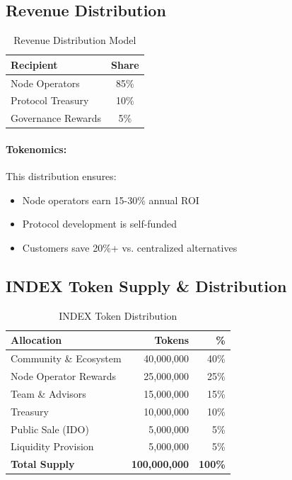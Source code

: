 \documentclass[12pt,a4paper]{article}
\begin{document}
\subsection{Revenue Distribution}

\begin{table}[h]
\centering
\begin{tabular}{lc}
\toprule
\textbf{Recipient} & \textbf{Share} \\
\midrule
Node Operators & 85\% \\
Protocol Treasury & 10\% \\
Governance Rewards & 5\% \\
\bottomrule
\end{tabular}
\caption{Revenue Distribution Model}
\end{table}

\paragraph{Tokenomics:} This distribution ensures:
\begin{itemize}
    \item Node operators earn 15-30\% annual ROI
    \item Protocol development is self-funded
    \item Customers save 20\%+ vs. centralized alternatives
\end{itemize}

\subsection{INDEX Token Supply \& Distribution}

\begin{table}[h]
\centering
\begin{tabular}{lrr}
\toprule
\textbf{Allocation} & \textbf{Tokens} & \textbf{\%} \\
\midrule
Community \& Ecosystem & 40,000,000 & 40\% \\
Node Operator Rewards & 25,000,000 & 25\% \\
Team \& Advisors & 15,000,000 & 15\% \\
Treasury & 10,000,000 & 10\% \\
Public Sale (IDO) & 5,000,000 & 5\% \\
Liquidity Provision & 5,000,000 & 5\% \\
\midrule
\textbf{Total Supply} & \textbf{100,000,000} & \textbf{100\%} \\
\bottomrule
\end{tabular}
\caption{INDEX Token Distribution}
\end{table}
\end{document}
